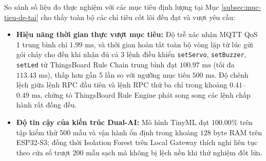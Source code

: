 So sánh số liệu đo thực nghiệm với các mục tiêu định lượng tại Mục \ref{subsec:muc-tieu-de-tai} cho thấy toàn bộ các chỉ tiêu cốt lõi đều đạt và vượt yêu cầu:
\begin{itemize}[leftmargin=*, itemsep=3pt]
  \item \textbf{Hiệu năng thời gian thực vượt mục tiêu:} Độ trễ xác nhận MQTT QoS 1 trung bình chỉ $1.99\text{ ms}$, và thời gian hoàn tất toàn bộ vòng lặp từ lúc gửi gói cháy cho đến khi nhận đủ cả 3 lệnh điều khiển \texttt{setServo}, \texttt{setBuzzer}, \texttt{setLed} từ ThingsBoard Rule Chain trung bình đạt $100.97\text{ ms}$ (tối đa $113.43\text{ ms}$), thấp hơn gần 5 lần so với ngưỡng mục tiêu $500\text{ ms}$. Độ chênh lệch giữa lệnh RPC đầu tiên và lệnh RPC thứ ba chỉ trong khoảng $0.41$--$0.49\text{ ms}$, chứng tỏ ThingsBoard Rule Engine phát song song các lệnh chấp hành rất đồng đều.
  \item \textbf{Độ tin cậy của kiến trúc Dual-AI:} Mô hình TinyML đạt $100.00\%$ trên tập kiểm thử 500 mẫu và vận hành ổn định trong khoảng $128\text{ byte}$ RAM trên ESP32-S3; đồng thời Isolation Forest trên Local Gateway thích nghi liên tục theo cửa sổ trượt 200 mẫu sạch mà không bị lệch nền khi thử nghiệm đốt lửa.
\end{itemize}

